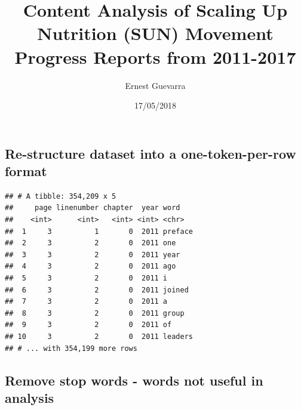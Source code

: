 \documentclass[12pt,a4paper]{article}
\title{Content Analysis of Scaling Up Nutrition (SUN) Movement Progress Reports
from 2011-2017}
\author{Ernest Guevarra}
\date{17/05/2018}
\newenvironment{Shaded}{\begin{snugshade}}{\end{snugshade}}
\newcommand{\KeywordTok}[1]{\textcolor[rgb]{0.13,0.29,0.53}{\textbf{#1}}}
\newcommand{\StringTok}[1]{\textcolor[rgb]{0.31,0.60,0.02}{#1}}
\newcommand{\OperatorTok}[1]{\textcolor[rgb]{0.81,0.36,0.00}{\textbf{#1}}}
\newcommand{\NormalTok}[1]{#1}
\begin{document}
\maketitle

\hypertarget{re-structure-dataset-into-a-one-token-per-row-format}{%
\subsection{Re-structure dataset into a one-token-per-row
format}\label{re-structure-dataset-into-a-one-token-per-row-format}}

\begin{Shaded}
\end{Shaded}

\begin{verbatim}
## # A tibble: 354,209 x 5
##     page linenumber chapter  year word   
##    <int>      <int>   <int> <int> <chr>  
##  1     3          1       0  2011 preface
##  2     3          2       0  2011 one    
##  3     3          2       0  2011 year   
##  4     3          2       0  2011 ago    
##  5     3          2       0  2011 i      
##  6     3          2       0  2011 joined 
##  7     3          2       0  2011 a      
##  8     3          2       0  2011 group  
##  9     3          2       0  2011 of     
## 10     3          2       0  2011 leaders
## # ... with 354,199 more rows
\end{verbatim}

\hypertarget{remove-stop-words---words-not-useful-in-analysis}{%
\subsection{Remove stop words - words not useful in
analysis}\label{remove-stop-words---words-not-useful-in-analysis}}

\begin{Shaded}
\end{Shaded}
\end{document}
